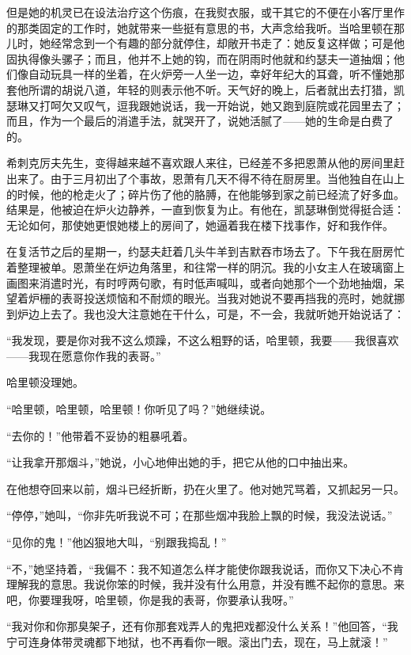 \par 但是她的机灵已在设法治疗这个伤痕，在我熨衣服，或干其它的不便在小客厅里作的那类固定的工作时，她就带来一些挺有意思的书，大声念给我听。当哈里顿在那儿时，她经常念到一个有趣的部分就停住，却敞开书走了：她反复这样做；可是他固执得像头骡子；而且，他并不上她的钩，而在阴雨时他就和约瑟夫一道抽烟；他们像自动玩具一样的坐着，在火炉旁一人坐一边，幸好年纪大的耳聋，听不懂她那套他所谓的胡说八道，年轻的则表示他不听。天气好的晚上，后者就出去打猎，凯瑟琳又打呵欠又叹气，逗我跟她说话，我一开始说，她又跑到庭院或花园里去了；而且，作为一个最后的消遣手法，就哭开了，说她活腻了——她的生命是白费了的。
\par 希刺克厉夫先生，变得越来越不喜欢跟人来往，已经差不多把恩萧从他的房间里赶出来了。由于三月初出了个事故，恩萧有几天不得不待在厨房里。当他独自在山上的时候，他的枪走火了；碎片伤了他的胳膊，在他能够到家之前已经流了好多血。结果是，他被迫在炉火边静养，一直到恢复为止。有他在，凯瑟琳倒觉得挺合适：无论如何，那使她更恨她楼上的房间了，她逼着我在楼下找事作，好和我作伴。
\par 在复活节之后的星期一，约瑟夫赶着几头牛羊到吉默吞市场去了。下午我在厨房忙着整理被单。恩萧坐在炉边角落里，和往常一样的阴沉。我的小女主人在玻璃窗上画图来消遣时光，有时哼两句歌，有时低声喊叫，或者向她那个一个劲地抽烟，呆望着炉栅的表哥投送烦恼和不耐烦的眼光。当我对她说不要再挡我的亮时，她就挪到炉边上去了。我也没大注意她在干什么，可是，不一会，我就听她开始说话了：
\par “我发现，要是你对我不这么烦躁，不这么粗野的话，哈里顿，我要——我很喜欢——我现在愿意你作我的表哥。”
\par 哈里顿没理她。
\par “哈里顿，哈里顿，哈里顿！你听见了吗？”她继续说。
\par “去你的！”他带着不妥协的粗暴吼着。
\par “让我拿开那烟斗，”她说，小心地伸出她的手，把它从他的口中抽出来。
\par 在他想夺回来以前，烟斗已经折断，扔在火里了。他对她咒骂着，又抓起另一只。
\par “停停，”她叫，“你非先听我说不可；在那些烟冲我脸上飘的时候，我没法说话。”
\par “见你的鬼！”他凶狠地大叫，“别跟我捣乱！”
\par “不，”她坚持着，“我偏不：我不知道怎么样才能使你跟我说话，而你又下决心不肯理解我的意思。我说你笨的时候，我并没有什么用意，并没有瞧不起你的意思。来吧，你要理我呀，哈里顿，你是我的表哥，你要承认我呀。”
\par “我对你和你那臭架子，还有你那套戏弄人的鬼把戏都没什么关系！”他回答，“我宁可连身体带灵魂都下地狱，也不再看你一眼。滚出门去，现在，马上就滚！”
